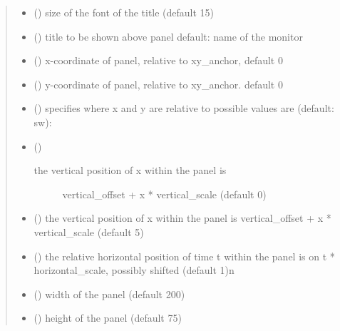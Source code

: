 \documentclass[letterpaper,10pt,english]{sphinxmanual}
\begin{document}
\begin{fulllineitems}
\begin{quote}
\begin{description}
\begin{itemize}
\item {} 
 () \textendash{} size of the font of the title (default 15)

\item {} 
 () \textendash{} title to be shown above panel 
default: name of the monitor

\item {} 
 () \textendash{} x-coordinate of panel, relative to xy\_anchor, default 0

\item {} 
 () \textendash{} y-coordinate of panel, relative to xy\_anchor. default 0

\item {} 
 () \textendash{} specifies where x and y are relative to 
possible values are (default: sw): 

\item {} 
 () \textendash{} \begin{description}
\item[{the vertical position of x within the panel is}] \leavevmode
vertical\_offset + x * vertical\_scale (default 0)

\end{description}


\item {} 
 () \textendash{} the vertical position of x within the panel is
vertical\_offset + x * vertical\_scale (default 5)

\item {} 
 () \textendash{} the relative horizontal position of time t within the panel is on
t * horizontal\_scale, possibly shifted (default 1)\textbar{}n\textbar{}

\item {} 
 () \textendash{} width of the panel (default 200)

\item {} 
 () \textendash{} height of the panel (default 75)


\end{itemize}
\end{description}
\end{quote}
\end{fulllineitems}
\end{document}
